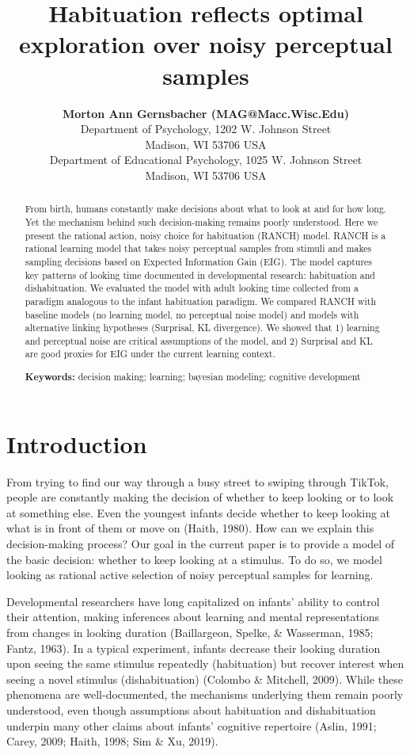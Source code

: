 \documentclass[10pt, letterpaper]{article}
\title{Habituation reflects optimal exploration over noisy perceptual
samples}
\author{{\large \bf Morton Ann Gernsbacher (MAG@Macc.Wisc.Edu)} \\ Department of Psychology, 1202 W. Johnson Street \\ Madison, WI 53706 USA \AND {\large \bf Sharon J.~Derry (SDJ@Macc.Wisc.Edu)} \\ Department of Educational Psychology, 1025 W. Johnson Street \\ Madison, WI 53706 USA}
\begin{document}
\maketitle

\begin{abstract}
From birth, humans constantly make decisions about what to look at and
for how long. Yet the mechanism behind such decision-making remains
poorly understood. Here we present the rational action, noisy choice for
habituation (RANCH) model. RANCH is a rational learning model that takes
noisy perceptual samples from stimuli and makes sampling decisions based
on Expected Information Gain (EIG). The model captures key patterns of
looking time documented in developmental research: habituation and
dishabituation. We evaluated the model with adult looking time collected
from a paradigm analogous to the infant habituation paradigm. We
compared RANCH with baseline models (no learning model, no perceptual
noise model) and models with alternative linking hypotheses (Surprisal,
KL divergence). We showed that 1) learning and perceptual noise are
critical assumptions of the model, and 2) Surprisal and KL are good
proxies for EIG under the current learning context.

\textbf{Keywords:}
decision making; learning; bayesian modeling; cognitive development
\end{abstract}

\hypertarget{introduction}{%
\section{Introduction}\label{introduction}}

From trying to find our way through a busy street to swiping through
TikTok, people are constantly making the decision of whether to keep
looking or to look at something else. Even the youngest infants decide
whether to keep looking at what is in front of them or move on (Haith,
1980). How can we explain this decision-making process? Our goal in the
current paper is to provide a model of the basic decision: whether to
keep looking at a stimulus. To do so, we model looking as rational
active selection of noisy perceptual samples for learning.

Developmental researchers have long capitalized on infants' ability to
control their attention, making inferences about learning and mental
representations from changes in looking duration (Baillargeon, Spelke,
\& Wasserman, 1985; Fantz, 1963). In a typical experiment, infants
decrease their looking duration upon seeing the same stimulus repeatedly
(habituation) but recover interest when seeing a novel stimulus
(dishabituation) (Colombo \& Mitchell, 2009). While these phenomena are
well-documented, the mechanisms underlying them remain poorly
understood, even though assumptions about habituation and dishabituation
underpin many other claims about infants' cognitive repertoire (Aslin,
1991; Carey, 2009; Haith, 1998; Sim \& Xu, 2019).
\end{document}
